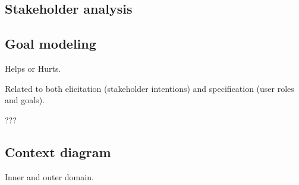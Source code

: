 \subsection{Stakeholder analysis}

\subsection{Goal modeling}

Helps or Hurts.

Related to both elicitation (stakeholder intentions) and specification (user roles and goals).

???

\subsection{Context diagram}

Inner and outer domain.






